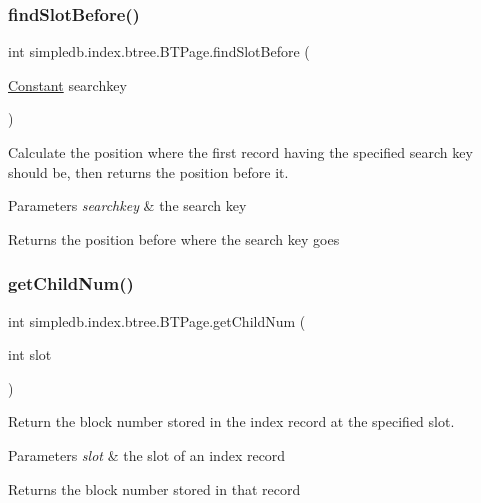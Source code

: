 \subsubsection{\texorpdfstring{find\+Slot\+Before()}{findSlotBefore()}}
{\footnotesize\ttfamily int simpledb.\+index.\+btree.\+B\+T\+Page.\+find\+Slot\+Before (\begin{DoxyParamCaption}\item[{\hyperlink{classsimpledb_1_1query_1_1Constant}{Constant}}]{searchkey }\end{DoxyParamCaption})\hspace{0.3cm}{\ttfamily [inline]}}

Calculate the position where the first record having the specified search key should be, then returns the position before it. 
\begin{DoxyParams}{Parameters}
{\em searchkey} & the search key \\
\hline
\end{DoxyParams}
\begin{DoxyReturn}{Returns}
the position before where the search key goes 
\end{DoxyReturn}
\mbox{\label{classsimpledb_1_1index_1_1btree_1_1BTPage_a94c6ab7b56f3456083e2d18d0b5cd036}} 
\subsubsection{\texorpdfstring{get\+Child\+Num()}{getChildNum()}}
{\footnotesize\ttfamily int simpledb.\+index.\+btree.\+B\+T\+Page.\+get\+Child\+Num (\begin{DoxyParamCaption}\item[{int}]{slot }\end{DoxyParamCaption})\hspace{0.3cm}{\ttfamily [inline]}}

Return the block number stored in the index record at the specified slot. 
\begin{DoxyParams}{Parameters}
{\em slot} & the slot of an index record \\
\hline
\end{DoxyParams}
\begin{DoxyReturn}{Returns}
the block number stored in that record 
\end{DoxyReturn}
\mbox{\label{classsimpledb_1_1index_1_1btree_1_1BTPage_a58b8e14ece178dfaa8032f20eb3236d5}} 
